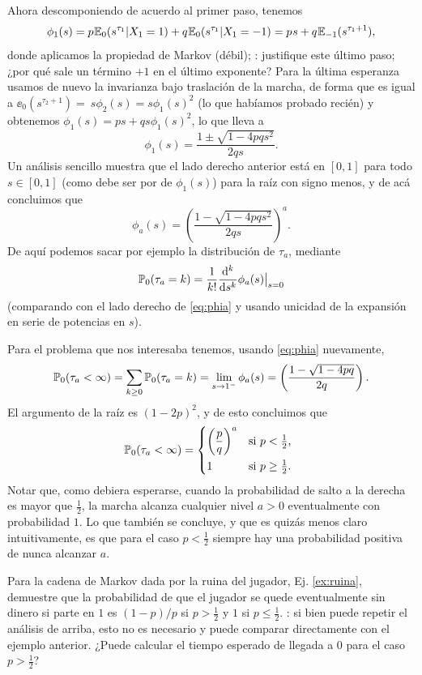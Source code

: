 Ahora descomponiendo de acuerdo al primer paso, tenemos
\[\phi_1(s)=p\hspace{0.05em}\mathbb{E}_0(s^{\tau_1}|X_1=1)+q\hspace{0.05em}\mathbb{E}_0(s^{\tau_1}|X_1=-1)=p\hspace{0.05em} s+q\hspace{0.05em}\mathbb{E}_{-1}(s^{\tau_1+1}),\]
donde aplicamos la propiedad de Markov (débil); \uexers: justifique este último paso; ¿por qué sale un término $+1$ en el último exponente?
Para la última esperanza usamos de nuevo la invarianza bajo traslación de la marcha, de forma que es igual a $\ee_{0}(s^{\tau_2+1})=~s\phi_2(s)=s\phi_1(s)^2$ (lo que habíamos probado recién) y obtenemos $\phi_1(s)=ps+qs\phi_1(s)^2$, lo que lleva a 
\[\phi_1(s)=\frac{1\pm\sqrt{1-4pqs^2}}{2qs}.\]
Un análisis sencillo muestra que el lado derecho anterior está en $[0,1]$ para todo $s\in[0,1]$ (como debe ser por de $\phi_1(s)$) para la raíz con signo menos, y de acá concluimos que
\[\phi_a(s)=\left(\frac{1-\sqrt{1-4pqs^2}}{2qs}\right)^a.\]
De aquí podemos sacar por ejemplo la distribución de $\tau_a$, mediante
\[\mathbb{P}_0(\tau_a=k)=\frac{1}{k!}\frac{\mathrm{d}^k}{\mathrm{d} s^k}\phi_a(s)\big|_{s=0}\]
(comparando con el lado derecho de \eqref{eq:phia} y usando unicidad de la expansión en serie de potencias en $s$).

Para el problema que nos interesaba tenemos, usando \eqref{eq:phia} nuevamente,
\[\mathbb{P}_0(\tau_a<\infty)=\sum_{k\geq0}\mathbb{P}_0(\tau_a=k)=\lim_{s\to1^-}\phi_a(s)=\left(\frac{1-\sqrt{1-4pq}}{2q}\right).\]
El argumento de la raíz es $(1-2p)^2$, y de esto concluimos que
\[\pp_0(\tau_a<\infty)=
\begin{dcases*}
\left(\frac{p}{q}\right)^a & si $p<\tfrac12$,\\
1 & si $p\geq\tfrac12$.
\end{dcases*}\]
Notar que, como debiera esperarse, cuando la probabilidad de salto a la derecha es mayor que $\frac12$, la marcha alcanza cualquier nivel $a>0$ eventualmente con probabilidad $1$.
Lo que también se concluye, y que es quizás menos claro intuitivamente, es que para el caso $p<\frac12$ siempre hay una probabilidad positiva de nunca alcanzar $a$.

\begin{ex}
Para la cadena de Markov dada por la ruina del jugador, Ej. \ref{ex:ruina}, demuestre que la probabilidad de que el jugador se quede eventualmente sin dinero si parte en $1$ es $(1-p)/p$ si $p>\frac12$ y $1$ si $p\leq\frac12$.
\uindic: si bien puede repetir el análisis de arriba, esto no es necesario y puede comparar directamente con el ejemplo anterior.
¿Puede calcular el tiempo esperado de llegada a $0$ para el caso $p>\frac12$?
\end{ex}

